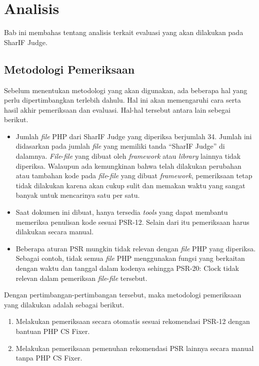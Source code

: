 \chapter{Analisis}
\label{chap:analisis}
Bab ini membahas tentang analisis terkait evaluasi yang akan dilakukan pada SharIF Judge. 


\section{Metodologi Pemeriksaan}
\label{sec:metodologi}

Sebelum menentukan metodologi yang akan digunakan, ada beberapa hal yang perlu dipertimbangkan terlebih dahulu. Hal ini akan memengaruhi cara serta hasil akhir pemeriksaan dan evaluasi. Hal-hal tersebut antara lain sebegai berikut.
\begin{itemize}
	\item Jumlah \textit{file} PHP dari SharIF Judge yang diperiksa berjumlah 34. Jumlah ini didasarkan pada jumlah \textit{file} yang memiliki tanda ``SharIF Judge'' di dalamnya. \textit{File}-\textit{file} yang dibuat oleh \textit{framework} atau \textit{library} lainnya tidak diperiksa. Walaupun ada kemungkinan bahwa telah dilakukan perubahan atau tambahan kode pada \textit{file}-\textit{file} yang dibuat \textit{framework}, pemeriksaan tetap tidak dilakukan karena akan cukup sulit dan memakan waktu yang sangat banyak untuk mencarinya satu per satu. 
	\item Saat dokumen ini dibuat, hanya tersedia \textit{tools} yang dapat membantu memeriksa penulisan kode sesuai PSR-12. Selain dari itu pemeriksaan harus dilakukan secara manual.
	\item Beberapa aturan PSR mungkin tidak relevan dengan \textit{file} PHP yang diperiksa. Sebagai contoh, tidak semua \textit{file} PHP menggunakan fungsi yang berkaitan dengan waktu dan tanggal dalam kodenya sehingga PSR-20: Clock tidak relevan dalam pemeriksan \textit{file}-\textit{file} tersebut.
\end{itemize} 
Dengan pertimbangan-pertimbangan tersebut, maka metodologi pemeriksaan yang dilakukan adalah sebagai berikut.
\begin{enumerate}
	\item Melakukan pemeriksaan secara otomatis sesuai rekomendasi PSR-12 dengan bantuan PHP CS Fixer.
	\item Melakukan pemeriksaan pemenuhan rekomendasi PSR lainnya secara manual tanpa PHP CS Fixer. 
\end{enumerate}


